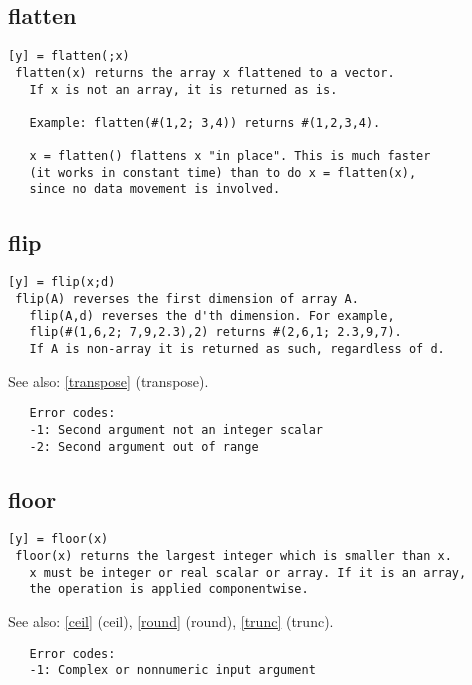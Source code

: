 \documentclass[a4paper]{article}
\begin{document}
\subsection{flatten\label{flatten}}

\begin{tscreen}
\begin{verbatim}
[y] = flatten(;x)
 flatten(x) returns the array x flattened to a vector.
   If x is not an array, it is returned as is.

   Example: flatten(#(1,2; 3,4)) returns #(1,2,3,4).
   
   x = flatten() flattens x "in place". This is much faster
   (it works in constant time) than to do x = flatten(x),
   since no data movement is involved. 
\end{verbatim}
\end{tscreen}





\subsection{flip\label{flip}}

\begin{tscreen}
\begin{verbatim}
[y] = flip(x;d)
 flip(A) reverses the first dimension of array A.
   flip(A,d) reverses the d'th dimension. For example,
   flip(#(1,6,2; 7,9,2.3),2) returns #(2,6,1; 2.3,9,7).
   If A is non-array it is returned as such, regardless of d.
\end{verbatim}

See also: \ref{transpose} {(transpose)}.
\begin{verbatim}
   Error codes:
   -1: Second argument not an integer scalar
   -2: Second argument out of range 
\end{verbatim}
\end{tscreen}





\subsection{floor\label{floor}}

\begin{tscreen}
\begin{verbatim}
[y] = floor(x)
 floor(x) returns the largest integer which is smaller than x.
   x must be integer or real scalar or array. If it is an array,
   the operation is applied componentwise.
\end{verbatim}

See also: \ref{ceil} {(ceil)}, \ref{round} {(round)}, \ref{trunc} {(trunc)}.
\begin{verbatim}
   Error codes:
   -1: Complex or nonnumeric input argument 
\end{verbatim}
\end{tscreen}
\end{document}
